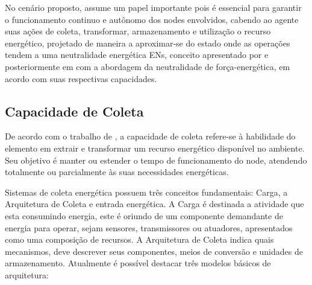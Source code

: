 No cenário proposto, assume um papel importante pois é essencial para garantir o funcionamento continuo e autônomo dos nodes envolvidos, cabendo ao agente suas ações de coleta, transformar, armazenamento e utilização o recurso energético, projetado de maneira a aproximar-se do estado onde as operações tendem a uma neutralidade energética \acfp{EN}, conceito apresentado por \cite{kansal_power_2007} e posteriormente em \cite{merrett_energy-driven_2017} com a abordagem da neutralidade de força-energética, em acordo com suas respectivas capacidades.







\subsection{Capacidade de Coleta}\label{Capacidade de Coleta}
De acordo com o trabalho de \cite{sudevalayam_energy_2011}, a capacidade de coleta refere-se à habilidade do elemento em extrair e transformar um recurso energético disponível no ambiente. Seu objetivo é manter ou estender o tempo de funcionamento do node, atendendo totalmente ou parcialmente às suas necessidades energéticas.

Sistemas de coleta energética possuem três conceitos fundamentais: Carga, a Arquitetura de Coleta e entrada energética. A Carga é destinada a atividade que esta consumindo energia, este é oriundo de um componente demandante de energia para operar, sejam sensores, transmissores ou  atuadores, apresentados como uma composição de recursos. A Arquitetura de Coleta indica quais mecanismos, deve descrever seus componentes, meios de conversão e unidades de armazenamento. Atualmente é possível destacar três modelos básicos de arquitetura:

